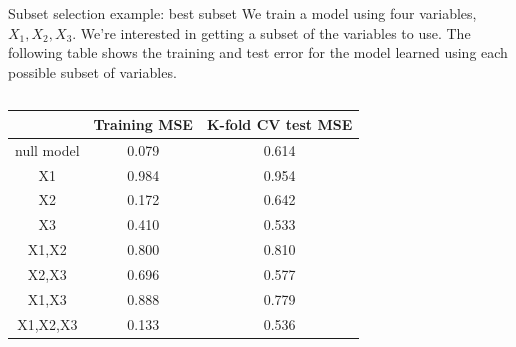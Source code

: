\documentclass[aspectratio=169,usenames,dvipsnames]{beamer}
\begin{document}
	\begin{frame}[t]{Subset selection example: best subset}
		We train a model using four variables, $X_1,X_2,X_3$.
		We're interested in getting a subset of the variables to use. The following table shows the training and test error for the model learned using each possible subset of variables.
		\begin{columns}
		\centering
		\begin{center}
		\begin{tabular}{c | c | c}
				& Training MSE & K-fold CV test MSE\\
			\hline
			null model & 0.079 &	0.614\\
			\hline
			X1 &0.984	&0.954 \\
			\hline
			X2&0.172	&0.642\\
			\hline
			X3&0.410	&0.533\\
			\hline
			X1,X2&0.800	&0.810\\
			\hline
			X2,X3&0.696	&0.577\\
			\hline
			X1,X3&0.888	&0.779\\
			\hline
			X1,X2,X3&0.133	&0.536\\
			\hline
		\end{tabular}
		\end{center}
		
		\centering

		
		\end{columns}
		\end{frame}
\end{document}
